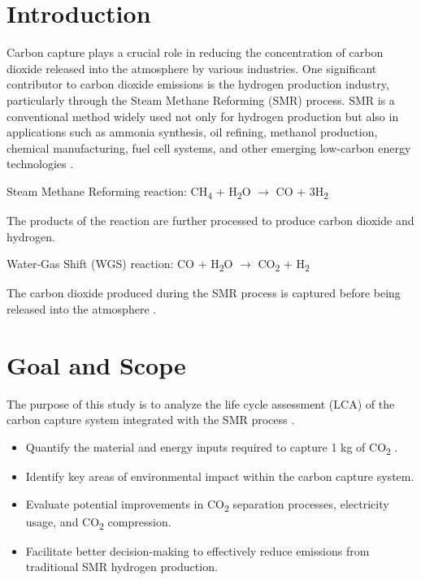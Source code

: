 \documentclass[12pt, a4paper]{report}
\begin{document}
\tableofcontents
\thispagestyle{fancy}
\listoftables
\thispagestyle{fancy}
\listoffigures
\thispagestyle{fancy}
\newpage

\chapter{Introduction}
Carbon capture plays a crucial role in reducing the concentration of carbon dioxide released into the atmosphere by various industries. One significant contributor to carbon dioxide emissions is the hydrogen production industry, particularly through the Steam Methane Reforming (SMR) process. SMR is a conventional method widely used not only for hydrogen production but also in applications such as ammonia synthesis, oil refining, methanol production, chemical manufacturing, fuel cell systems, and other emerging low-carbon energy technologies \cite{Spath}.

\begin{center}
Steam Methane Reforming reaction: CH\textsubscript{4} + H\textsubscript{2}O $\rightarrow$ CO + 3H\textsubscript{2}
\end{center}

The products of the reaction are further processed to produce carbon dioxide and hydrogen.

\begin{center}
Water-Gas Shift (WGS) reaction: CO + H\textsubscript{2}O $\rightarrow$ CO\textsubscript{2} + H\textsubscript{2}
\end{center}

The carbon dioxide produced during the SMR process is captured before being released into the atmosphere \cite{Soltani}.

\chapter{Goal and Scope}
The purpose of this study is to analyze the life cycle assessment (LCA) of the carbon capture system integrated with the SMR process \cite{National Energy Technology Laboratory}.

\begin{itemize}
  \item Quantify the material and energy inputs required to capture 1 kg of CO\textsubscript{2} \cite{Dufour,Rubin}.
  \item Identify key areas of environmental impact within the carbon capture system.
  \item Evaluate potential improvements in CO\textsubscript{2} separation processes, electricity usage, and CO\textsubscript{2} compression.
  \item Facilitate better decision-making to effectively reduce emissions from traditional SMR hydrogen production.
\end{itemize}
\end{document}
